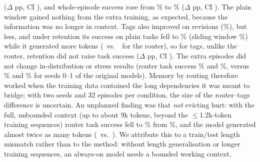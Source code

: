 \documentclass[10pt]{article}
\begin{document}
($\Delta$\,\dlongfarlfrouterrevise\,pp, CI \dlongfarlfrouterreviseci), and whole-episode success rose from \longfarlfrouterplainepisode\% to \longfarlfroutermemepisode\% ($\Delta$\,\dlongfarlfrouterepisode\,pp, CI \dlongfarlfrouterepisodeci). The plain window gained nothing from the extra training, as expected, because the information was no longer in context. Tags also improved on revisions (\longfarlftagsmemrevise\%), but less, and under retention its success on plain tasks fell to \longfarlftagsmemplain\% (sliding window \longfarlftagsplainplain\%) while it generated more tokens (\longfarlftagsmemtokens\ vs.\ \longfarlfroutermemtokens\ for the router), so for tags, unlike the router, retention did not raise task success ($\Delta$\,\dlongfarlftagstask\,pp, CI \dlongfarlftagstaskci). The extra episodes did not change in-distribution or stress results (router task success \lfrouterid\% and \lfrouterstress\%, versus \lfrouterbaseid\% and \lfrouterbasestress\% for seeds 0--1 of the original models). Memory by routing therefore worked when the training data contained the long dependencies it was meant to bridge; with two seeds and 32 episodes per condition, the size of the router--tags difference is uncertain. An unplanned finding was that \emph{not} evicting hurt: with the full, unbounded context (up to about 9k tokens, beyond the $\leq$1.2k-token training sequences) router task success fell to \longrouterfulltask\% from \longroutermemtask\%, and the model generated almost twice as many tokens (\longrouterfulltokens\ vs.\ \longroutermemtokens). We attribute this to a train/test length mismatch rather than to the method: without length generalisation or longer training sequences, an always-on model needs a bounded working context.

\begin{table}[t]
\centering\scriptsize\setlength{\tabcolsep}{3pt}
\caption{Long-horizon episodes (32 episodes, about 30 tasks over 3000 ticks) under three context policies; mean of seeds 0--2 with 95\% CI.}
\label{tab:long}
\resizebox{\linewidth}{!}{}
\end{table}

\begin{table}[t]
\centering\scriptsize\setlength{\tabcolsep}{3pt}
\caption{Memory stress (\emph{longfar}, 32 episodes): revisions and cancellations arrive 700--1500 ticks after their task, after the request has left the 640-token window. Seeds 0--2 of the models of Table~\ref{tab:long}, no retraining; mean with 95\% CI.}
\label{tab:longfar}
\resizebox{\linewidth}{!}{}
\end{table}
\end{document}
